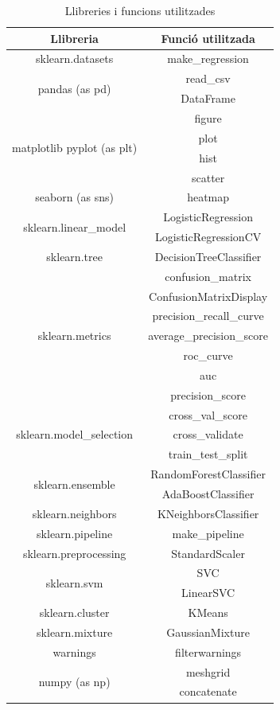 \documentclass[a4paper, 11pt]{article}
\begin{document}
\begin{table}[h]
    \centering
    \begin{tabular}{c|c}
        \textbf{Llibreria} & \textbf{Funció utilitzada} \\\hline\hline
        sklearn.datasets & make\_regression \\ \hline
         \multirow{2}{*}{pandas (as pd)} & read\_csv \\ 
        & DataFrame \\ \hline
        \multirow{4}{*}{matplotlib pyplot (as plt)} & figure\\
        & plot \\ 
        & hist \\
        & scatter\\ \hline
        seaborn (as sns) & heatmap \\\hline
        \multirow{2}{*}{sklearn.linear\_model} & LogisticRegression \\
         & LogisticRegressionCV \\\hline
        sklearn.tree & DecisionTreeClassifier\\ \hline
        \multirow{7}{*}{sklearn.metrics} & confusion\_matrix \\ 
        & ConfusionMatrixDisplay \\
        & precision\_recall\_curve\\
        & average\_precision\_score\\
        & roc\_curve\\
        & auc \\
        & precision\_score \\\hline
        \multirow{3}{*}{sklearn.model\_selection} & cross\_val\_score \\ 
        & cross\_validate \\
        & train\_test\_split \\\hline
        \multirow{2}{*}{sklearn.ensemble} & RandomForestClassifier \\ 
        & AdaBoostClassifier \\\hline
        sklearn.neighbors & KNeighborsClassifier \\ \hline
        sklearn.pipeline & make\_pipeline\\ \hline
        sklearn.preprocessing & StandardScaler\\ \hline
        \multirow{2}{*}{sklearn.svm} & SVC\\ 
        & LinearSVC \\\hline
        sklearn.cluster & KMeans \\\hline
        sklearn.mixture & GaussianMixture \\ \hline
        warnings & filterwarnings \\ \hline
        \multirow{2}{*}{numpy (as np)} & meshgrid \\
        & concatenate \\
    \end{tabular}
    \label{imports}
    \caption{Llibreries i funcions utilitzades}
\end{table}
\end{document}
